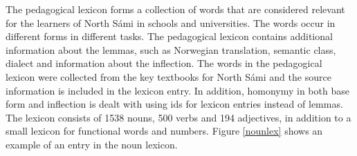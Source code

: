 \documentclass[11pt]{article}
\begin{document}



The pedagogical lexicon forms a collection of words that are considered relevant for the learners of North Sámi in schools and universities. The words occur in different forms in different tasks. The pedagogical lexicon contains additional information about the lemmas, such as Norwegian translation, semantic class, dialect and information about the inflection. The words in the pedagogical lexicon were collected from the key textbooks for North Sámi and the source information is included in the lexicon entry. %
In addition, homonymy in both base form and inflection is dealt with using ids for lexicon entries instead of lemmas. 
The lexicon consists of 1538 nouns, 500 verbs and 194 adjectives, in addition to a small lexicon for %
functional words and numbers. Figure \ref{nounlex} shows an example of an entry in the noun lexicon. \\
\end{document}
